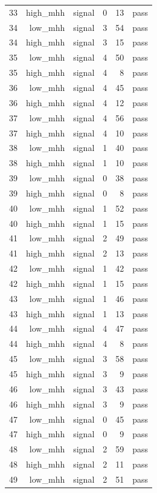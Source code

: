 \begin{table}[htbp]
{\begin{tabular}{lrrrrr}
33 & high\_mhh & signal & 0 & 13 & pass \\
34 & low\_mhh & signal & 3 & 54 & pass \\
34 & high\_mhh & signal & 3 & 15 & pass \\
35 & low\_mhh & signal & 4 & 50 & pass \\
35 & high\_mhh & signal & 4 & 8 & pass \\
36 & low\_mhh & signal & 4 & 45 & pass \\
36 & high\_mhh & signal & 4 & 12 & pass \\
37 & low\_mhh & signal & 4 & 56 & pass \\
37 & high\_mhh & signal & 4 & 10 & pass \\
38 & low\_mhh & signal & 1 & 40 & pass \\
38 & high\_mhh & signal & 1 & 10 & pass \\
39 & low\_mhh & signal & 0 & 38 & pass \\
39 & high\_mhh & signal & 0 & 8 & pass \\
40 & low\_mhh & signal & 1 & 52 & pass \\
40 & high\_mhh & signal & 1 & 15 & pass \\
41 & low\_mhh & signal & 2 & 49 & pass \\
41 & high\_mhh & signal & 2 & 13 & pass \\
42 & low\_mhh & signal & 1 & 42 & pass \\
42 & high\_mhh & signal & 1 & 15 & pass \\
43 & low\_mhh & signal & 1 & 46 & pass \\
43 & high\_mhh & signal & 1 & 13 & pass \\
44 & low\_mhh & signal & 4 & 47 & pass \\
44 & high\_mhh & signal & 4 & 8 & pass \\
45 & low\_mhh & signal & 3 & 58 & pass \\
45 & high\_mhh & signal & 3 & 9 & pass \\
46 & low\_mhh & signal & 3 & 43 & pass \\
46 & high\_mhh & signal & 3 & 9 & pass \\
47 & low\_mhh & signal & 0 & 45 & pass \\
47 & high\_mhh & signal & 0 & 9 & pass \\
48 & low\_mhh & signal & 2 & 59 & pass \\
48 & high\_mhh & signal & 2 & 11 & pass \\
49 & low\_mhh & signal & 2 & 51 & pass \\

\end{tabular}}
\end{table}
